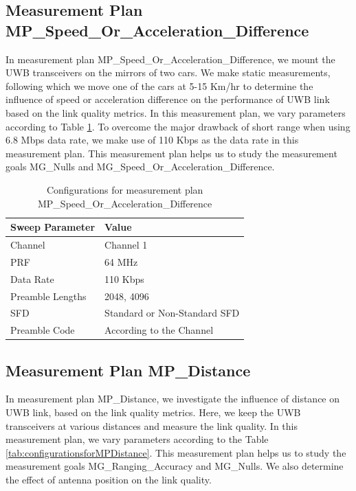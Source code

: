 \subsection{Measurement Plan MP\_Speed\_Or\_Acceleration\_Difference}
In measurement plan MP\_Speed\_Or\_Acceleration\_Difference, we mount the UWB transceivers on the mirrors of two cars. We make static measurements, following which we move one of the cars at 5-15 Km/hr to determine the influence of speed or acceleration difference on the performance of UWB link based on the link quality metrics. In this measurement plan, we vary parameters according to Table \ref{table:configurationsformeasurementplanMPSpeedDifference}. To overcome the major drawback of short range when using 6.8 Mbps data rate, we make use of 110 Kbps as the data rate in this measurement plan. This measurement plan helps us to study the measurement goals MG\_Nulls and MG\_Speed\_Or\_Acceleration\_Difference. 

\begin{table}[]
    \centering
    \caption{Configurations for measurement plan MP\_Speed\_Or\_Acceleration\_Difference}
    \label{table:configurationsformeasurementplanMPSpeedDifference}
    \begin{tabular}{|l|l|}
        \hline
        \textbf{Sweep Parameter} & \textbf{Value}               \\ \hline
        Channel                  & Channel 1                    \\ \hline
        PRF                      & 64 MHz                       \\ \hline
        Data Rate                & 110 Kbps                     \\ \hline
        Preamble Lengths         & 2048, 4096                   \\ \hline
        SFD                      & Standard or Non-Standard SFD \\ \hline
        Preamble Code            & According to the Channel     \\ \hline
    \end{tabular}
\end{table}


\subsection{Measurement Plan MP\_Distance}
In measurement plan MP\_Distance, we investigate the influence of distance on UWB link, based on the link quality metrics. Here, we keep the UWB transceivers at various distances and measure the link quality. In this measurement plan, we vary parameters according to the Table \ref{tab:configurationsforMPDistance}. This measurement plan helps us to study the measurement goals MG\_Ranging\_Accuracy and MG\_Nulls. We also determine the effect of antenna position on the link quality.

